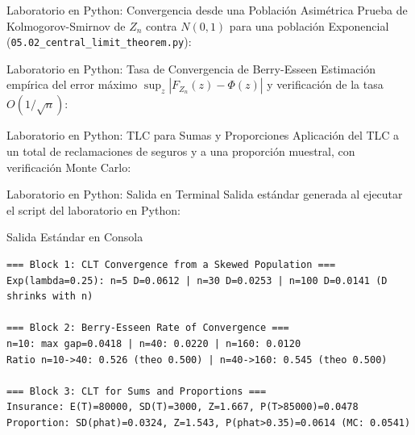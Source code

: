 \documentclass[10pt, aspectratio=169]{beamer}
\begin{document}
\begin{frame}[fragile]{Laboratorio en Python: Convergencia desde una Población Asimétrica}
  \scriptsize
  Prueba de Kolmogorov-Smirnov de $Z_n$ contra $N(0,1)$ para una población Exponencial (\texttt{05.02\_central\_limit\_theorem.py}):
  {
  }
\end{frame}

\begin{frame}[fragile]{Laboratorio en Python: Tasa de Convergencia de Berry-Esseen}
  \scriptsize
  Estimación empírica del error máximo $\sup_z|F_{Z_n}(z)-\Phi(z)|$ y verificación de la tasa $O(1/\sqrt{n})$:
  {
  }
\end{frame}

\begin{frame}[fragile]{Laboratorio en Python: TLC para Sumas y Proporciones}
  \scriptsize
  Aplicación del TLC a un total de reclamaciones de seguros y a una proporción muestral, con verificación Monte Carlo:
  {
  }
\end{frame}

\begin{frame}[fragile]{Laboratorio en Python: Salida en Terminal}
  \scriptsize
  Salida estándar generada al ejecutar el script del laboratorio en Python:
  \vspace{0.02cm}
  \begin{block}{Salida Estándar en Consola}
    \fontsize{4pt}{5pt}\selectfont
    \begin{verbatim}
=== Block 1: CLT Convergence from a Skewed Population ===
Exp(lambda=0.25): n=5 D=0.0612 | n=30 D=0.0253 | n=100 D=0.0141 (D shrinks with n)

=== Block 2: Berry-Esseen Rate of Convergence ===
n=10: max gap=0.0418 | n=40: 0.0220 | n=160: 0.0120
Ratio n=10->40: 0.526 (theo 0.500) | n=40->160: 0.545 (theo 0.500)

=== Block 3: CLT for Sums and Proportions ===
Insurance: E(T)=80000, SD(T)=3000, Z=1.667, P(T>85000)=0.0478
Proportion: SD(phat)=0.0324, Z=1.543, P(phat>0.35)=0.0614 (MC: 0.0541)
    \end{verbatim}
  \end{block}
\end{frame}
\end{document}
